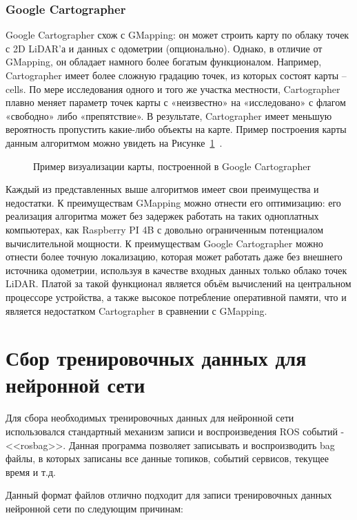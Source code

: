 \subsubsection{Google Cartographer}
Google Cartographer схож с GMapping: он может строить карту по облаку точек с 2D LiDAR'а и данных с одометрии (опционально). Однако, в отличие от GMapping, он обладает намного более богатым функционалом. Например, Cartographer имеет более сложную градацию точек, из которых состоят карты – cells. По мере исследования одного и того же участка местности, Cartographer плавно меняет параметр точек карты с «неизвестно» на «исследовано» с флагом «свободно» либо «препятствие». В результате, Cartographer имеет меньшую вероятность пропустить какие-либо объекты на карте. Пример построения карты данным алгоритмом можно увидеть на Рисунке~\cref{fig:cartographer}~\cite{slam}.

\begin{figure}[ht]
    \caption{Пример визуализации карты, построенной в Google Cartographer}\label{fig:cartographer}
\end{figure}

Каждый из представленных выше алгоритмов имеет свои преимущества и недостатки. К преимуществам GMapping можно отнести его оптимизацию: его реализация алгоритма может без задержек работать на таких одноплатных компьютерах, как Raspberry PI 4B с довольно ограниченным потенциалом вычислительной мощности. К преимуществам Google Cartographer можно отнести более точную локализацию, которая может работать даже без внешнего источника одометрии, используя в качестве входных данных только облако точек LiDAR. Платой за такой функционал является объём вычислений на центральном процессоре устройства, а также высокое потребление оперативной памяти, что и является недостатком Cartographer в сравнении с GMapping.

\section{Сбор тренировочных данных для нейронной сети}
Для сбора необходимых тренировочных данных для нейронной сети использовался стандартный механизм записи и воспроизведения ROS событий - <<rosbag>>. Данная программа позволяет записывать и воспроизводить bag файлы, в которых записаны все данные топиков, событий сервисов, текущее время и т.д. 

Данный формат файлов отлично подходит для записи тренировочных данных нейронной сети по следующим причинам:


